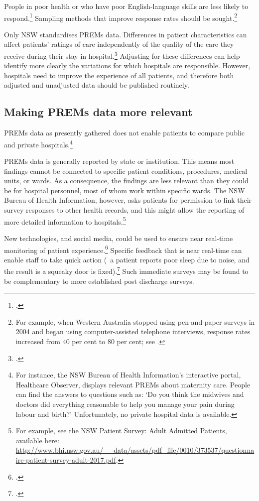 \documentclass[FrontPage]{grattan}
\begin{document}
People in poor health or who have poor English-language skills are less likely to respond.\footcites{linden2013selective}{Ahlmark-etal-2014-Survey-nonresponse-among-ethnic-minorities}
Sampling methods that improve response rates should be sought.\footnote{For example, when Western Australia stopped using pen-and-paper surveys in 2004 and began using computer-assisted telephone interviews, response rates increased from 40 per cent to 80 per cent; see \textcite{wa2007response}.}  

Only NSW standardises PREMs data. Differences in patient characteristics can affect patients’ ratings of care independently of the quality of the care they receive during their stay in hospital.\footcite{BHI2010insight}
Adjusting for these differences can help identify more clearly the variations for which hospitals are responsible. However, hospitals need to improve the experience of all patients, and therefore both adjusted and unadjusted data should be published routinely. 

\subsection{Making PREMs data more relevant}\label{subsec:PREMsrelevant}
PREMs data as presently gathered does not enable patients to compare public and private hospitals.\footnote{For instance, the NSW Bureau of Health Information’s interactive portal, Healthcare Observer, displays relevant PREMs about maternity care. People can find the answers to questions such as: ‘Do you think the midwives and doctors did everything reasonable to help you manage your pain during labour and birth?’ Unfortunately, no private hospital data is available.}

PREMs data is generally reported by state or institution. This means most findings cannot be connected to specific patient conditions, procedures, medical units, or wards. As a consequence, the findings are less relevant than they could be for hospital personnel, most of whom work within specific wards. The NSW Bureau of Health Information, however, asks patients for permission to link their survey responses to other health records, and this might allow the reporting of more detailed information to hospitals.\footnote{For example, see the NSW Patient Survey: Adult Admitted Patients, available here: \textcolor{blue}{\url{http://www.bhi.nsw.gov.au/__data/assets/pdf_file/0010/373537/questionnaire-patient-survey-adult-2017.pdf}}.}

New technologies, and social media, could be used to ensure near real-time monitoring of patient experience.\footcite{RN52}
Specific feedback that is near real-time can enable staff to take quick action (\eg~a patient reports poor sleep due to noise, and the result is a squeaky door is fixed).\footcite{deridder2017}
Such immediate surveys may be found to be complementary to more established post discharge surveys.
\end{document}
